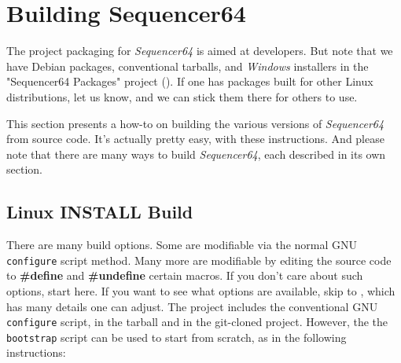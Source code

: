 %
%
%

\section{Building Sequencer64}
\label{sec:seq64_build}

   The project packaging for \textsl{Sequencer64}
   is aimed at developers.
   But note that we have Debian packages, conventional tarballs,
   and \textsl{Windows} installers in the "Sequencer64
   Packages" project (\cite{sequencer64packages}).
   If one has packages built for other Linux distributions, let us know, and we
   can stick them there for others to use.

   This section presents a how-to on building the various versions of
   \textsl{Sequencer64} from source code.  It's actually pretty easy, with
   these instructions. And please note that there are many ways to build
   \textsl{Sequencer64}, each described in its own section.

\subsection{Linux INSTALL Build}
\label{subsec:seq64_build_install}

   There are many build options.  Some are modifiable via the normal GNU
   \texttt{configure} script method.  Many more are modifiable by
   editing the source code to \textbf{\#define} and \textbf{\#undefine} certain
   macros.  If you don't care about such options, start here.  If you want to
   see what options are available, skip to
   , which has many details one can
   adjust.
   The project includes the conventional GNU \texttt{configure} script, in the
   tarball and in the git-cloned project.  However, the
   the \texttt{bootstrap} script can be used to start from scratch,
   as in the following instructions:

